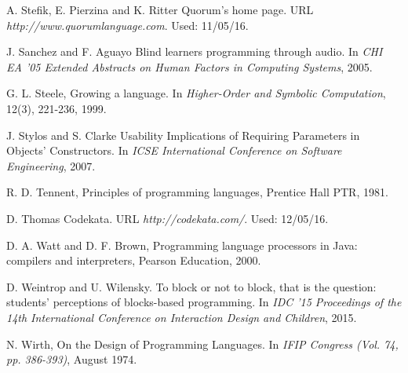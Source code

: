 \documentclass[10pt]{sigplanconf}
\begin{document}
\begin{thebibliography}{}
A. Stefik, E. Pierzina and K. Ritter \newblock Quorum's home page. \newblock URL \emph{http://www.quorumlanguage.com}. \newblock Used: 11/05/16.

J. Sanchez and F. Aguayo \newblock Blind learners programming through audio. \newblock In \emph{CHI EA '05 Extended Abstracts on Human Factors in Computing Systems}, 2005.

G. L. Steele, \newblock Growing a language. \newblock In \emph{Higher-Order and Symbolic Computation}, 12(3), 221-236, 1999.

J. Stylos and S. Clarke \newblock Usability Implications of Requiring Parameters in Objects' Constructors. \newblock In \emph{ICSE International Conference on Software Engineering}, 2007.

R. D. Tennent, \newblock Principles of programming languages, \newblock Prentice Hall PTR, 1981.

D. Thomas \newblock Codekata. \newblock URL \emph{http://codekata.com/}. \newblock Used: 12/05/16.

D. A. Watt and D. F. Brown, \newblock Programming language processors in Java: compilers and interpreters, \newblock Pearson Education, 2000.

D. Weintrop and U. Wilensky. \newblock To block or not to block, that is the question: students' perceptions of blocks-based programming. \newblock In \emph{IDC '15 Proceedings of the 14th International Conference on Interaction Design and Children}, 2015.

N. Wirth, \newblock On the Design of Programming Languages. \newblock In \emph{IFIP Congress (Vol. 74, pp. 386-393)}, August 1974.





\end{thebibliography}
\end{document}
